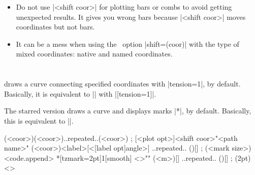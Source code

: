 \remark
\begin{itemize}
\item
Do not use |<shift coor>| for plotting bars or combs to avoid getting unexpected results. It gives you wrong bars because |<shift coor>| moves coordinates but not bars. 


\item
It can be a mess when using the \Tikz\ option |shift={(coor)}| with the type of mixed coordinates: native and named coordinates.


\end{itemize}



\section{\protect\cmd{\tzplotcurve(*)}}
\label{s:tzplotcurve}

\icmd{\tzplotcurve} draws a curve connecting specified coordinates with |tension=1|, by default. Basically, it is equivalent to |\tzplot| with |[tension=1]|.

The starred version \icmd{\tzplotcurve*} draws a curve and displays marks |*|, by default.
Basically, this is equivalent to |\tzpolot*[draw,tension=1]|.

\begin{tzdef}{}
\tzplotcurve(<coor>)(<coor>)..repeated..(<coor>) ;
 [<plot opt>]<shift coor>"<path name>"
             (<coor>){<label>}[<[label opt]angle>] 
             ..repeated.. 
             (){}[] ; (<mark size>) <code.append>
 *[tzmark=2pt]{1}[smooth] <>"" (<m>){}[] ..repeated.. (){}[] ; (2pt) <>
\end{tzdef}

